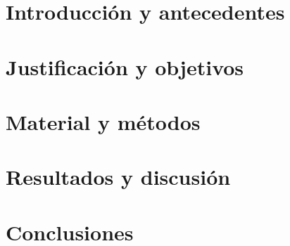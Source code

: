 \documentclass[a4paper,12pt]{book}
\begin{document}
\mainmatter %
\pagestyle{headings}

\def\tablename{Tabla}%
\onehalfspace
\setlength{\parskip}{3mm}%
\setlength{\parindent}{1cm}%


\chapter{Introducción y antecedentes}


\chapter{Justificación y objetivos}


\chapter{Material y métodos}\label{Materialymetodos}


\chapter{Resultados y discusión}


\chapter{Conclusiones}\label{Conclusiones}





%
\end{document}
